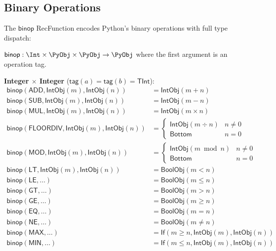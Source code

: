 \subsection{Binary Operations}

The $\mathsf{binop}$ RecFunction encodes Python's binary operations
with full type dispatch:

\begin{definition}
$\mathsf{binop} : \Int \times \PyObj \times \PyObj \to \PyObj$
where the first argument is an operation tag.

\textbf{Integer $\times$ Integer} ($\mathsf{tag}(a) = \mathsf{tag}(b)
= \mathsf{TInt}$):
\begin{align}
  \mathsf{binop}(\mathsf{ADD}, \mathsf{IntObj}(m),
    \mathsf{IntObj}(n)) &= \mathsf{IntObj}(m + n) \\
  \mathsf{binop}(\mathsf{SUB}, \mathsf{IntObj}(m),
    \mathsf{IntObj}(n)) &= \mathsf{IntObj}(m - n) \\
  \mathsf{binop}(\mathsf{MUL}, \mathsf{IntObj}(m),
    \mathsf{IntObj}(n)) &= \mathsf{IntObj}(m \times n) \\
  \mathsf{binop}(\mathsf{FLOORDIV}, \mathsf{IntObj}(m),
    \mathsf{IntObj}(n)) &= \begin{cases}
      \mathsf{IntObj}(m \div n) & n \neq 0 \\
      \mathsf{Bottom} & n = 0
    \end{cases} \\
  \mathsf{binop}(\mathsf{MOD}, \mathsf{IntObj}(m),
    \mathsf{IntObj}(n)) &= \begin{cases}
      \mathsf{IntObj}(m \bmod n) & n \neq 0 \\
      \mathsf{Bottom} & n = 0
    \end{cases} \\
  \mathsf{binop}(\mathsf{LT}, \mathsf{IntObj}(m),
    \mathsf{IntObj}(n)) &= \mathsf{BoolObj}(m < n) \\
  \mathsf{binop}(\mathsf{LE}, \ldots) &= \mathsf{BoolObj}(m \leq n) \\
  \mathsf{binop}(\mathsf{GT}, \ldots) &= \mathsf{BoolObj}(m > n) \\
  \mathsf{binop}(\mathsf{GE}, \ldots) &= \mathsf{BoolObj}(m \geq n) \\
  \mathsf{binop}(\mathsf{EQ}, \ldots) &= \mathsf{BoolObj}(m = n) \\
  \mathsf{binop}(\mathsf{NE}, \ldots) &= \mathsf{BoolObj}(m \neq n) \\
  \mathsf{binop}(\mathsf{MAX}, \ldots) &= \mathsf{If}(m \geq n,
    \mathsf{IntObj}(m), \mathsf{IntObj}(n)) \\
  \mathsf{binop}(\mathsf{MIN}, \ldots) &= \mathsf{If}(m \leq n,
    \mathsf{IntObj}(m), \mathsf{IntObj}(n))
\end{align}


\end{definition}
